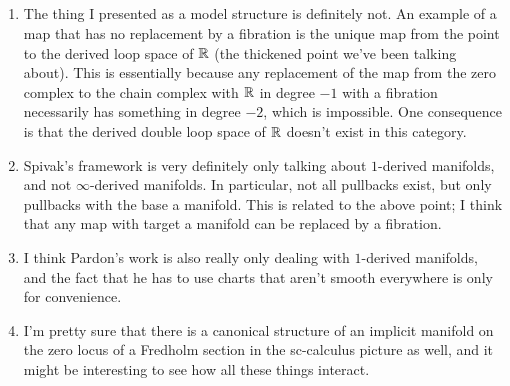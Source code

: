 \subsection{}

\begin{enumerate}

\item The thing I presented as a model structure is definitely not. An example of a map that has no replacement by a fibration is the unique map from the point to the derived loop space of $\mathbb R$ (the thickened point we've been talking about). This is essentially because any replacement of the map from the zero complex to the chain complex with $\mathbb R$ in degree $-1$ with a fibration necessarily has something in degree $-2$, which is impossible. One consequence is that the derived double loop space of $\mathbb R$ doesn't exist in this category.

\item Spivak's framework is very definitely only talking about $1$-derived manifolds, and not $\infty$-derived manifolds. In particular, not all pullbacks exist, but only pullbacks with the base a manifold. This is related to the above point; I think that any map with target a manifold can be replaced by a fibration.

\item I think Pardon's work is also really only dealing with $1$-derived manifolds, and the fact that he has to use charts that aren't smooth everywhere is only for convenience.

\item I'm pretty sure that there is a canonical structure of an implicit manifold on the zero locus of a Fredholm section in the sc-calculus picture as well, and it might be interesting to see how all these things interact.

\end{enumerate}
